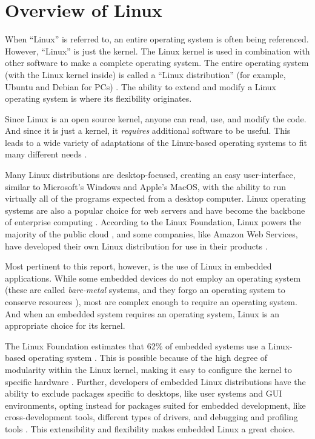 \section*{Overview of Linux}
    When ``Linux'' is referred to, an entire operating system is often being
        referenced.
    However, ``Linux'' is just the kernel.
    The Linux kernel is used in combination with other software to make a
    complete operating system.
    The entire operating system (with the Linux kernel inside) is called a
        ``Linux distribution'' (for example, Ubuntu and Debian for PCs)
        \cite{stallman}.
    The ability to extend and modify a Linux operating system is where its
        flexibility originates.

    Since Linux is an open source kernel, anyone can read, use, and modify the
        code.
    And since it is just a kernel, it \textit{requires} additional software to
        be useful.
    This leads to a wide variety of adaptations of the Linux-based operating
        systems to fit many different needs \cite{comparative-os}.

    Many Linux distributions are desktop-focused, creating an easy
        user-interface, similar to Microsoft's Windows and Apple's MacOS, with
        the ability to run virtually all of the programs expected from a desktop
        computer.
    Linux operating systems are also a popular choice for web servers and have
        become the backbone of enterprise computing \cite{grandview}.
    According to the Linux Foundation, Linux powers the majority of the public
        cloud \cite{linux-public-cloud}, and some companies, like Amazon Web
        Services, have developed their own Linux distribution for use in their
        products \cite{aws-linux}.

    Most pertinent to this report, however, is the use of Linux in embedded
        applications.
    While some embedded devices do not employ an operating system (these are
        called \textit{bare-metal} systems, and they forgo an operating system
        to conserve resources \cite{bare-metal}), most are complex enough to
        require an operating system.
    And when an embedded system requires an operating system, Linux is an
        appropriate choice for its kernel.

    The Linux Foundation estimates that 62\% of embedded systems use a
        Linux-based operating system \cite{linux-public-cloud}.
    This is possible because of the high degree of modularity within the Linux
        kernel, making it easy to configure the kernel to specific hardware
        \cite{embedded-textbook}.
    Further, developers of embedded Linux distributions have the ability to
        exclude packages specific to desktops, like user systems and GUI
        environments, opting instead for packages suited for embedded development,
        like cross-development tools, different types of drivers, and debugging
        and profiling tools \cite{embedded-textbook}.
    This extensibility and flexibility makes embedded Linux a great choice.

